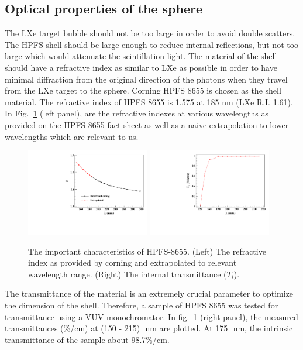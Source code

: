 \subsection{Optical properties of the sphere }
\label{sec:opt}

The LXe target bubble should not be too large in order to avoid double scatters. 
The HPFS shell should be large enough to reduce internal reflections, but not 
too large which would attenuate the scintillation light. The material of the 
shell should have a refractive index as similar to LXe as possible in order to 
have minimal diffraction from the original direction of the photons when they 
travel from the LXe target to the sphere. Corning HPFS 8655 is chosen as the shell 
material. The refractive index of HPFS 8655 is 1.575 at 185 nm (LXe R.I. 1.61). 
In Fig.~\ref{fig:hpfsRIcalibration} (left panel), are the refractive indexes at various wavelengths 
as provided on the HPFS 8655 fact sheet as well as a naive extrapolation to lower wavelengths 
which are relevant to us. 

\begin{figure}[h]
   \centering
   \includegraphics[width=0.48\textwidth]{RI-calibration.pdf}
    \includegraphics[width=0.48\textwidth]{IntTransmittance.pdf}
   \caption{The important characteristics of HPFS-8655. (Left) The refractive index as provided by corning and 
   extrapolated to relevant wavelength range. (Right) The internal transmittance ($T_{i}$).} 
   \label{fig:hpfsRIcalibration}
\end{figure}

The transmittance of the material is an extremely crucial parameter to optimize the 
dimension of the shell. Therefore, a sample of HPFS 8655 was tested for transmittance 
using a VUV monochromator. 
In fig.~\ref{fig:hpfsRIcalibration} (right panel), the measured 
transmittances (\%/cm) at (150 - 215)~\,nm are plotted. At 175~\,nm, the intrinsic transmittance 
of the sample about 98.7\%/cm.  


